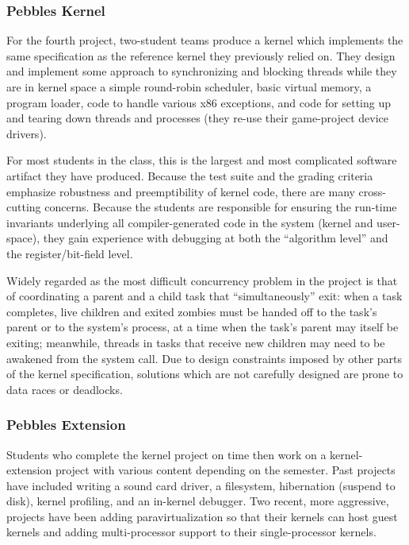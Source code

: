 \subsubsection{Pebbles Kernel}
For the fourth project, two-student teams
produce a kernel which implements the
same specification as the reference kernel
they previously relied on.
They design and implement some approach to
synchronizing and blocking threads while
they are in kernel space
a simple round-robin scheduler,
basic virtual memory,
a program loader,
code to handle various x86 exceptions,
and code for setting up and tearing down
threads and processes
(they re-use their game-project device drivers).

For most students in the class, this is the
largest and most complicated software artifact they
have produced.
Because the test suite and the grading criteria
emphasize robustness and preemptibility of
kernel code,
there are many cross-cutting concerns.
%
Because the students are responsible for ensuring
the run-time invariants underlying all compiler-generated
code in the system (kernel and user-space),
they gain experience with debugging at both the
``algorithm level'' and the register/bit-field level.

Widely regarded as the most difficult concurrency problem in the project
is that of coordinating a parent and a child task that ``simultaneously''
exit:
when a task completes,
live children and exited zombies must be handed off
to the task's parent or to the system's  process,
at a time when the task's parent may itself be
exiting;
meanwhile, threads in tasks that receive new children
may need to be awakened from the  system call.
Due to design constraints imposed by other parts of the kernel specification,
solutions which are not carefully designed
are prone to data races or deadlocks.

\subsubsection{Pebbles Extension}
Students who complete the kernel project on time
then work on a kernel-extension project
{with various content depending on the semester.}
Past projects have included
writing a sound card driver,
a filesystem,
hibernation (suspend to disk),
kernel profiling,
and an in-kernel debugger.
Two recent, more aggressive, projects have been
adding paravirtualization so that their kernels
can host guest kernels and
adding multi-processor support to their single-processor kernels.

